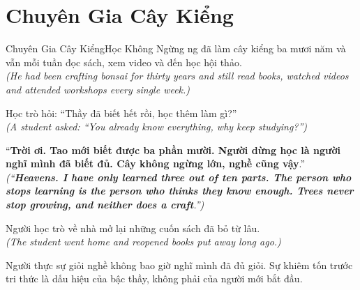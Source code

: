 \section{Chuyên Gia Cây Kiểng}
\begin{truyen}{Chuyên Gia Cây Kiểng}{Học Không Ngừng}
ng đã làm cây kiểng ba mươi năm và vẫn mỗi tuần đọc sách, xem video và đến học hội thảo.\\
\textit{(He had been crafting bonsai for thirty years and still read books, watched videos and attended workshops every single week.)}

Học trò hỏi: ``Thầy đã biết hết rồi, học thêm làm gì?''\\
\textit{(A student asked: ``You already know everything, why keep studying?'')}

``\textbf{Trời ơi. Tao mới biết được ba phần mười. Người dừng học là người nghĩ mình đã biết đủ. Cây không ngừng lớn, nghề cũng vậy}.''\\
\textit{(``\textbf{Heavens. I have only learned three out of ten parts. The person who stops learning is the person who thinks they know enough. Trees never stop growing, and neither does a craft}.'')}

Người học trò về nhà mở lại những cuốn sách đã bỏ từ lâu.\\
\textit{(The student went home and reopened books put away long ago.)}
\end{truyen}
\begin{baihoc}
  Người thực sự giỏi nghề không bao giờ nghĩ mình đã đủ giỏi. Sự khiêm tốn trước tri thức là dấu hiệu của bậc thầy, không phải của người mới bắt đầu.
\end{baihoc}

